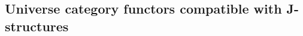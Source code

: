 \documentclass[12pt]{article}
\begin{document}
\subsection{Universe category functors compatible with J-structures}
\end{document}
